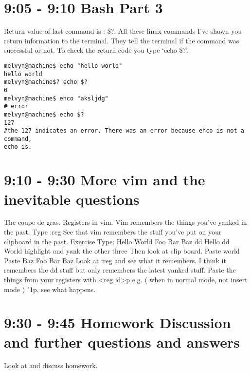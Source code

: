 \documentclass[10pt]{article}
\begin{document}
\section*{ 9:05 - 9:10 Bash Part 3 }

Return value of last command is : \$?. All these linux commands I've shown you
return information to the terminal. They tell the terminal if the command was
successful or not. To check the return code you type `echo \$?'.

\begin{lstlisting}[style=term]
melvyn@machine$ echo "hello world"
hello world 
melvyn@machine$? echo $?
0
melvyn@machine$ ehco "aksljdg"
# error
melvyn@machine$ echo $?
127
#the 127 indicates an error. There was an error because ehco is not a command,
echo is.
\end{lstlisting}

\section{ 9:10 - 9:30 More vim and the inevitable questions }
The coupe de gras. Registers in vim. Vim remembers the things you've yanked in the past. Type :reg
See that vim remembers the stuff you've put on your clipboard in the past.
Exercise
Type:
Hello
World
Foo
Bar
Baz
dd Hello
dd World
highlight and yank the other three
Then look at clip board.
Paste world
Paste Baz
Foo
Bar
Baz
Look at :reg and see what it remembers. I think it remembers the dd stuff but only remembers the latest yanked stuff.
Paste the things from your registers with <reg id>p e.g. ( when  in normal mode, not insert mode ) "1p, see what happens. 


\section*{ 9:30 - 9:45 Homework Discussion and further questions and answers }
Look at and discuss homework.
\end{document}
